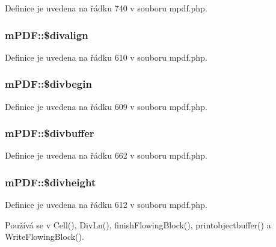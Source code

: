 Definice je uvedena na řádku 740 v souboru mpdf.\-php.

\hypertarget{classm_p_d_f_a9d6484d6836411ed79d00b0a9637b0fa}{
\subsubsection[{\$divalign}]{\setlength{\rightskip}{0pt plus 5cm}m\-P\-D\-F\-::\$divalign}}\label{classm_p_d_f_a9d6484d6836411ed79d00b0a9637b0fa}


Definice je uvedena na řádku 610 v souboru mpdf.\-php.

\hypertarget{classm_p_d_f_ab920aab46e7017d041bd9db1261fd48b}{
\subsubsection[{\$divbegin}]{\setlength{\rightskip}{0pt plus 5cm}m\-P\-D\-F\-::\$divbegin}}\label{classm_p_d_f_ab920aab46e7017d041bd9db1261fd48b}


Definice je uvedena na řádku 609 v souboru mpdf.\-php.

\hypertarget{classm_p_d_f_acae71c25a6f1215673f371c9cc5d9742}{
\subsubsection[{\$divbuffer}]{\setlength{\rightskip}{0pt plus 5cm}m\-P\-D\-F\-::\$divbuffer}}\label{classm_p_d_f_acae71c25a6f1215673f371c9cc5d9742}


Definice je uvedena na řádku 662 v souboru mpdf.\-php.

\hypertarget{classm_p_d_f_a5a6c8687e9055b7117884ec62ca1568a}{
\subsubsection[{\$divheight}]{\setlength{\rightskip}{0pt plus 5cm}m\-P\-D\-F\-::\$divheight}}\label{classm_p_d_f_a5a6c8687e9055b7117884ec62ca1568a}


Definice je uvedena na řádku 612 v souboru mpdf.\-php.



Používá se v Cell(), Div\-Ln(), finish\-Flowing\-Block(), printobjectbuffer() a Write\-Flowing\-Block().

